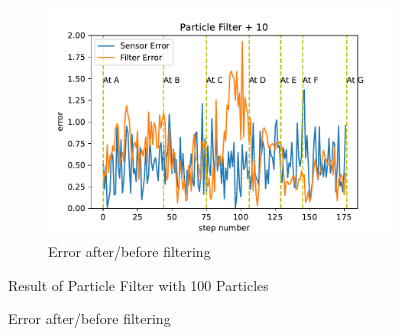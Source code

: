 \documentclass[conference,onecolumn]{IEEEtran}
\begin{document}
\begin{figure}[H]
\begin{subfigure}[t]{.3\linewidth}
    \centering\includegraphics[width=\linewidth]{Figs/Particle Filter + 10Error.pdf}
    \caption{Error after/before filtering}
  \end{subfigure}

   \smallskip\hrulefill \smallskip
  
  Result of Particle Filter with 100 Particles
  \medskip


\end{figure}
\end{document}
